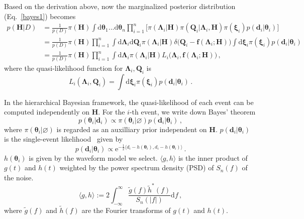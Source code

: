 \documentclass[a4paper,11pt]{article}
\begin{document}
Based on the derivation above, now the marginalized posterior distribution (Eq.~\eqref{bayes1}) becomes
\begin{equation}
\label{hierarchical bayes}
\begin{aligned}
p(\bm{H}|D)&=\frac{1}{p(D)}\pi(\bm{H})\int \text{d}\bm{\theta}_1...\text{d}\bm{\theta}_n \prod_{i=1}^n \big[\pi(\bm{\Lambda}_i|\bm{H})\pi(\bm{Q}_i|\bm{\Lambda}_i,\bm{H})\pi(\bm{\xi}_i)p(\bm{d}_i|\bm{\theta}_i)\big] \\
&=\frac{1}{p(D)} \pi(\bm{H}) \prod_{i=1}^n
\int \text{d}\bm{\Lambda}_i\text{d}\bm{Q}_i\pi(\bm{\Lambda}_i|\bm{H})\delta\big(\bm{Q}_i-\bm{f}(\bm{\Lambda}_i;\bm{H})\big) \int \text{d}\bm{\xi}_i \pi(\bm{\xi}_i)p(\bm{d}_i|\bm{\theta}_i)\\
&=\frac{1}{p(D)} \pi(\bm{H}) \prod_{i=1}^n
\int \text{d}\bm{\Lambda}_i\pi(\bm{\Lambda}_i|\bm{H})L_i\big(\bm{\Lambda}_i,\bm{f}(\bm{\Lambda}_i;\bm{H})\big)\,,
\end{aligned}
\end{equation}
where the quasi-likelihood function for $\bm{\Lambda}_i,\bm{Q}_i$ is
\begin{equation}
\label{quasi-likelihood}
    L_i(\bm{\Lambda}_i,\bm{Q}_i)=\int \text{d}\bm{\xi}_i \pi(\bm{\xi}_i)p(\bm{d}_i|\bm{\theta}_i)\,.
\end{equation}


In the hierarchical Bayesian framework, the quasi-likelihood of each event can be 
computed independently on $\bm{H}$. For the $i\text{-th}$ event, we write down Bayes' theorem
\begin{equation}
\label{single bayes}
    p(\bm{\theta}_i|\bm{d}_i)\propto \pi(\bm{\theta}_i|\varnothing)p(\bm{d}_i|\bm{\theta}_i)\,,
\end{equation}
where $\pi(\bm{\theta}_i|\varnothing)$ is regarded as an auxilliary prior 
independent on $\bm{H}$. $p(\bm{d}_i|\bm{\theta}_i)$ is the single-event likelihood~\cite{Finn:1992wt} given by
\begin{equation}
p(\bm{d}_i|\bm{\theta}_i)\propto \mathrm{e}^{-\frac{1}{2}\langle d_i-h(\bm{\theta}_i),d_i-h(\bm{\theta}_i)\rangle}\,.
\end{equation}
$h(\bm{\theta}_i)$ is given by the waveform model we select. $\langle g, h\rangle$ 
is the inner product of $g(t)$ and $h(t)$ weighted by the power spectrum density (PSD) of $S_n(f)$ of the noise.
\begin{equation}
    \langle g, h\rangle:= 2\int_{-\infty}^{\infty}\frac{\tilde{g}(f)\tilde{h}^{*}(f)}{S_n(|f|)} \text{d}f\,,
\end{equation}
where $\tilde{g}(f)$ and $\tilde{h}(f)$ are the Fourier transforms of $g(t)$ and $h(t)$.
\end{document}

